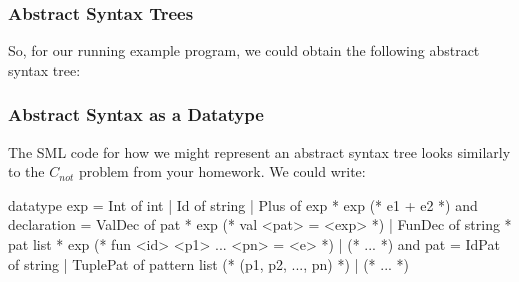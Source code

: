 \documentclass[aspectratio=169]{beamer}
\begin{document}
\begin{frame}[fragile]
  \frametitle{Abstract Syntax Trees}

  So, for our running example program, we could obtain
  the following abstract syntax tree:
  \pause
  \begin{center}
  \end{center}
\end{frame}

\begin{frame}[fragile]
  \frametitle{Abstract Syntax as a Datatype}

  \tgs

  The SML code for how we might represent an abstract syntax tree looks
  similarly to the $C_{not}$ problem from your homework. We could write:

  \pause
  \small
  \begin{codeblock}
    datatype exp =
        Int of int
      | Id of string
      | Plus of exp * exp               (* e1 + e2 *)
    and declaration =
        ValDec of pat * exp             (* val <pat> = <exp> *)
      | FunDec of string * pat list * exp
          (* fun <id> <p1> ... <pn> = <e> *)
      | (* ... *)
    and pat =
        IdPat of string
      | TuplePat of pattern list        (* (p1, p2, ..., pn) *)
      | (* ... *)
  \end{codeblock}
\end{frame}
\end{document}
